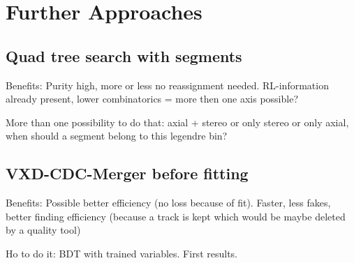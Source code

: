 
\section{Further Approaches} \label{section-outlook}
\subsection{Quad tree search with segments}
Benefits: Purity high, more or less no reassignment needed. RL-information already present, lower combinatorics = more then one axis possible?

More than one possibility to do that: axial + stereo or only stereo or only axial, when should a segment belong to this legendre bin?

\subsection{VXD-CDC-Merger before fitting}
Benefits: Possible better efficiency (no loss because of fit). Faster, less fakes, better finding efficiency (because a track is kept which would be maybe deleted by a quality tool)

Ho to do it: BDT with trained variables. First results.